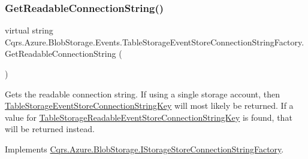 \mbox{\label{classCqrs_1_1Azure_1_1BlobStorage_1_1Events_1_1TableStorageEventStoreConnectionStringFactory_a047e58aa30e97231dc913df350bc2446_a047e58aa30e97231dc913df350bc2446}} 
\subsubsection{\texorpdfstring{Get\+Readable\+Connection\+String()}{GetReadableConnectionString()}}
{\footnotesize\ttfamily virtual string Cqrs.\+Azure.\+Blob\+Storage.\+Events.\+Table\+Storage\+Event\+Store\+Connection\+String\+Factory.\+Get\+Readable\+Connection\+String (\begin{DoxyParamCaption}{ }\end{DoxyParamCaption})\hspace{0.3cm}{\ttfamily [virtual]}}



Gets the readable connection string. If using a single storage account, then \hyperlink{classCqrs_1_1Azure_1_1BlobStorage_1_1Events_1_1TableStorageEventStoreConnectionStringFactory_a95f8662029c8a40117e326973de936bf_a95f8662029c8a40117e326973de936bf}{Table\+Storage\+Event\+Store\+Connection\+String\+Key} will most likely be returned. If a value for \hyperlink{classCqrs_1_1Azure_1_1BlobStorage_1_1Events_1_1TableStorageEventStoreConnectionStringFactory_ac28aea2439fe0bed85d1b53c0fd8fdaf_ac28aea2439fe0bed85d1b53c0fd8fdaf}{Table\+Storage\+Readable\+Event\+Store\+Connection\+String\+Key} is found, that will be returned instead. 



Implements \hyperlink{interfaceCqrs_1_1Azure_1_1BlobStorage_1_1IStorageStoreConnectionStringFactory_a0ed836289e048767f753630bbcc98d5d_a0ed836289e048767f753630bbcc98d5d}{Cqrs.\+Azure.\+Blob\+Storage.\+I\+Storage\+Store\+Connection\+String\+Factory}.

